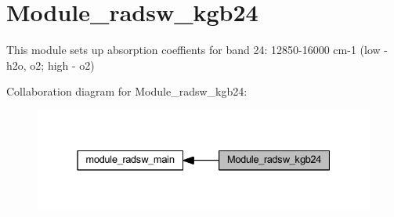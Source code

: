 \hypertarget{group__module__radsw__kgb24}{}\section{Module\+\_\+radsw\+\_\+kgb24}
\label{group__module__radsw__kgb24}


This module sets up absorption coeffients for band 24\+: 12850-\/16000 cm-\/1 (low -\/ h2o, o2; high -\/ o2)  


Collaboration diagram for Module\+\_\+radsw\+\_\+kgb24\+:\nopagebreak
\begin{figure}[H]
\begin{center}
\leavevmode
\includegraphics[width=331pt]{group__module__radsw__kgb24}
\end{center}
\end{figure}
